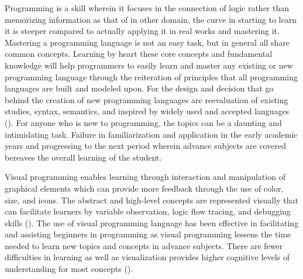 \parx
Programming is a skill wherein it focuses in the connection of logic rather than
memorizing information as that of in other domain, the curve in starting to
learn it is steeper compared to actually applying it in real works and mastering
it. Mastering a programming language is not an easy task, but in general all
share common concepts. Learning by heart these core concepts and fundamental
knowledge will help programmers to easily learn and master any existing or new
programming language through the reiteration of principles that all programming
languages are built and modeled upon. For the design and decision that go behind
the creation of new programming languages are reevaluation of existing studies,
syntax, semantics, and inspired by widely used and accepted languages
(\cite{stefik_siebert_slattery_stefik_2011}). For anyone who is new to
programming, the topics can be a daunting and intimidating task. Failure in
familiarization and application in the early academic years and progressing to
the next period wherein advance subjects are covered bereaves the overall
learning of the student.

\parx
Visual programming enables learning through interaction and manipulation of
graphical elements which can provide more feedback through the use of color,
size, and icons. The abstract and high-level concepts are represented visually
that can facilitate learners by variable observation, logic flow tracing, and
debugging skills (\cite{tsai_yang_chang_2015}).
The use of visual programming language has been effective in facilitating and
assisting beginners in programming as visual programming lessens the time
needed to learn new topics and concepts in advance subjects. There are fewer
difficulties in learning as well as visualization provides higher cognitive
levels of understanding for most concepts (\cite{armoni_2015}).

